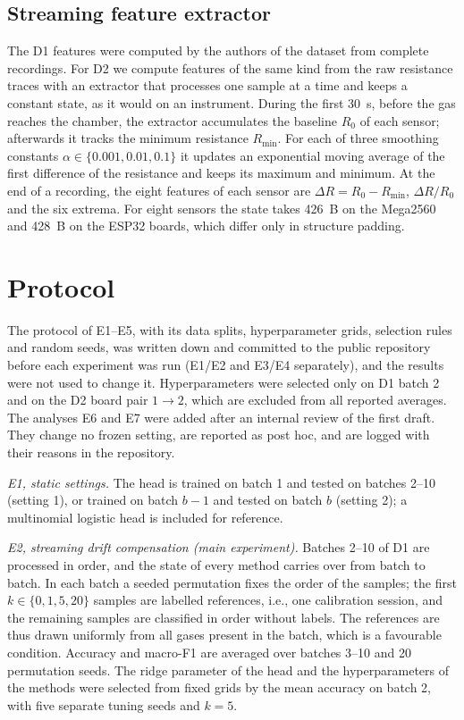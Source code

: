 \documentclass[journal,twoside,web]{ieeecolor}
\begin{document}
\subsection{Streaming feature extractor}
\label{sec:extractor}
The D1 features were computed by the authors of the dataset from complete recordings. For D2 we compute features of the same kind from the raw resistance traces with an extractor that processes one sample at a time and keeps a constant state, as it would on an instrument. During the first 30~s, before the gas reaches the chamber, the extractor accumulates the baseline $R_0$ of each sensor; afterwards it tracks the minimum resistance $R_{\min}$. For each of three smoothing constants $\alpha\in\{0.001,0.01,0.1\}$ it updates an exponential moving average of the first difference of the resistance and keeps its maximum and minimum. At the end of a recording, the eight features of each sensor are $\Delta R=R_0-R_{\min}$, $\Delta R/R_0$ and the six extrema. For eight sensors the state takes 426~B on the Mega2560 and 428~B on the ESP32 boards, which differ only in structure padding.

\section{Protocol}
\label{sec:protocol}
The protocol of E1--E5, with its data splits, hyperparameter grids, selection rules and random seeds, was written down and committed to the public repository before each experiment was run (E1/E2 and E3/E4 separately), and the results were not used to change it. Hyperparameters were selected only on D1 batch 2 and on the D2 board pair $1\rightarrow2$, which are excluded from all reported averages. The analyses E6 and E7 were added after an internal review of the first draft. They change no frozen setting, are reported as post hoc, and are logged with their reasons in the repository.

\emph{E1, static settings.} The head is trained on batch 1 and tested on batches 2--10 (setting 1), or trained on batch $b-1$ and tested on batch $b$ (setting 2); a multinomial logistic head is included for reference.

\emph{E2, streaming drift compensation (main experiment).} Batches 2--10 of D1 are processed in order, and the state of every method carries over from batch to batch. In each batch a seeded permutation fixes the order of the samples; the first $k\in\{0,1,5,20\}$ samples are labelled references, i.e., one calibration session, and the remaining samples are classified in order without labels. The references are thus drawn uniformly from all gases present in the batch, which is a favourable condition. Accuracy and macro-F1 are averaged over batches 3--10 and 20 permutation seeds. The ridge parameter of the head and the hyperparameters of the methods were selected from fixed grids by the mean accuracy on batch 2, with five separate tuning seeds and $k=5$.
\end{document}
